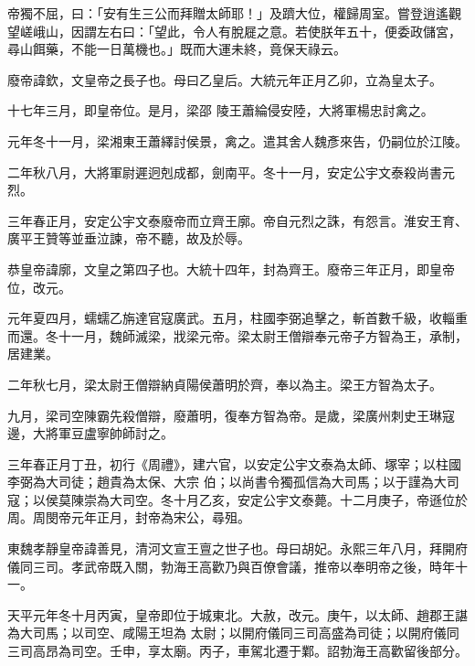 \begin{pinyinscope}
 帝獨不屈，曰：「安有生三公而拜贈太師耶！」及躋大位，權歸周室。嘗登逍遙觀望嵯峨山，因謂左右曰：「望此，令人有脫屣之意。若使朕年五十，便委政儲宮，尋山餌藥，不能一日萬機也。」既而大運未終，竟保天祿云。



 廢帝諱欽，文皇帝之長子也。母曰乙皇后。大統元年正月乙卯，立為皇太子。



 十七年三月，即皇帝位。是月，梁邵
 陵王蕭綸侵安陸，大將軍楊忠討禽之。



 元年冬十一月，梁湘東王蕭繹討侯景，禽之。遣其舍人魏彥來告，仍嗣位於江陵。



 二年秋八月，大將軍尉遲迥剋成都，劍南平。冬十一月，安定公宇文泰殺尚書元烈。



 三年春正月，安定公宇文泰廢帝而立齊王廓。帝自元烈之誅，有怨言。淮安王育、廣平王贊等並垂泣諫，帝不聽，故及於辱。



 恭皇帝諱廓，文皇之第四子也。大統十四年，封為齊王。廢帝三年正月，即皇帝位，改元。



 元年夏四月，蠕蠕乙旃達官寇廣武。五月，柱國李弼追擊之，斬首數千級，收輜重而還。冬十一月，魏師滅梁，戕梁元帝。梁太尉王僧辯奉元帝子方智為王，承制，居建業。



 二年秋七月，梁太尉王僧辯納貞陽侯蕭明於齊，奉以為主。梁王方智為太子。



 九月，梁司空陳霸先殺僧辯，廢蕭明，復奉方智為帝。是歲，梁廣州刺史王琳寇邊，大將軍豆盧寧帥師討之。



 三年春正月丁丑，初行《周禮》，建六官，以安定公宇文泰為太師、塚宰；以柱國李弼為大司徒；趙貴為太保、大宗
 伯；以尚書令獨孤信為大司馬；以于謹為大司寇；以侯莫陳崇為大司空。冬十月乙亥，安定公宇文泰薨。十二月庚子，帝遜位於周。周閔帝元年正月，封帝為宋公，尋殂。



 東魏孝靜皇帝諱善見，清河文宣王亶之世子也。母曰胡妃。永熙三年八月，拜開府儀同三司。孝武帝既入關，勃海王高歡乃與百僚會議，推帝以奉明帝之後，時年十一。



 天平元年冬十月丙寅，皇帝即位于城東北。大赦，改元。庚午，以太師、趙郡王諶為大司馬；以司空、咸陽王坦為
 太尉；以開府儀同三司高盛為司徒；以開府儀同三司高昂為司空。壬申，享太廟。丙子，車駕北遷于鄴。詔勃海王高歡留後部分。




\end{pinyinscope}

